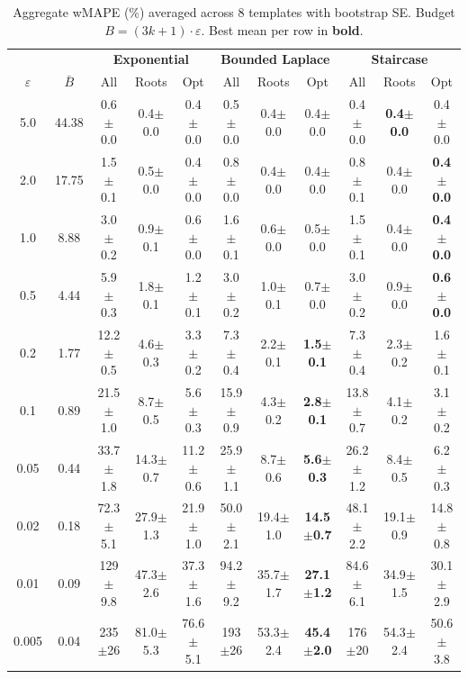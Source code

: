 \providecommand{\pmstd}[1]{{\scriptsize $\pm$#1}}

\begin{table}[t]
\centering
\setlength{\tabcolsep}{2.8pt}
\small
\caption{Aggregate wMAPE (\%) averaged across 8 templates with bootstrap SE. Budget $B = (3k+1) \cdot \varepsilon$. Best mean per row in \textbf{bold}.}
\label{tab:rq1_3kplus1_wmape}
\begin{tabular}{cc|ccc|ccc|ccc}
\toprule
& & \multicolumn{3}{c|}{\textbf{Exponential}} & \multicolumn{3}{c|}{\textbf{Bounded Laplace}} & \multicolumn{3}{c}{\textbf{Staircase}} \\
$\varepsilon$ & $\bar{B}$ & All & Roots & Opt & All & Roots & Opt & All & Roots & Opt \\
\midrule
5.0 & 44.38 & 0.6\pmstd{0.0} & 0.4\pmstd{0.0} & 0.4\pmstd{0.0} & 0.5\pmstd{0.0} & 0.4\pmstd{0.0} & 0.4\pmstd{0.0} & 0.4\pmstd{0.0} & \textbf{0.4\pmstd{0.0}} & 0.4\pmstd{0.0} \\
2.0 & 17.75 & 1.5\pmstd{0.1} & 0.5\pmstd{0.0} & 0.4\pmstd{0.0} & 0.8\pmstd{0.0} & 0.4\pmstd{0.0} & 0.4\pmstd{0.0} & 0.8\pmstd{0.1} & 0.4\pmstd{0.0} & \textbf{0.4\pmstd{0.0}} \\
1.0 & 8.88 & 3.0\pmstd{0.2} & 0.9\pmstd{0.1} & 0.6\pmstd{0.0} & 1.6\pmstd{0.1} & 0.6\pmstd{0.0} & 0.5\pmstd{0.0} & 1.5\pmstd{0.1} & 0.4\pmstd{0.0} & \textbf{0.4\pmstd{0.0}} \\
0.5 & 4.44 & 5.9\pmstd{0.3} & 1.8\pmstd{0.1} & 1.2\pmstd{0.1} & 3.0\pmstd{0.2} & 1.0\pmstd{0.1} & 0.7\pmstd{0.0} & 3.0\pmstd{0.2} & 0.9\pmstd{0.0} & \textbf{0.6\pmstd{0.0}} \\
0.2 & 1.77 & 12.2\pmstd{0.5} & 4.6\pmstd{0.3} & 3.3\pmstd{0.2} & 7.3\pmstd{0.4} & 2.2\pmstd{0.1} & \textbf{1.5\pmstd{0.1}} & 7.3\pmstd{0.4} & 2.3\pmstd{0.2} & 1.6\pmstd{0.1} \\
0.1 & 0.89 & 21.5\pmstd{1.0} & 8.7\pmstd{0.5} & 5.6\pmstd{0.3} & 15.9\pmstd{0.9} & 4.3\pmstd{0.2} & \textbf{2.8\pmstd{0.1}} & 13.8\pmstd{0.7} & 4.1\pmstd{0.2} & 3.1\pmstd{0.2} \\
0.05 & 0.44 & 33.7\pmstd{1.8} & 14.3\pmstd{0.7} & 11.2\pmstd{0.6} & 25.9\pmstd{1.1} & 8.7\pmstd{0.6} & \textbf{5.6\pmstd{0.3}} & 26.2\pmstd{1.2} & 8.4\pmstd{0.5} & 6.2\pmstd{0.3} \\
0.02 & 0.18 & 72.3\pmstd{5.1} & 27.9\pmstd{1.3} & 21.9\pmstd{1.0} & 50.0\pmstd{2.1} & 19.4\pmstd{1.0} & \textbf{14.5\pmstd{0.7}} & 48.1\pmstd{2.2} & 19.1\pmstd{0.9} & 14.8\pmstd{0.8} \\
0.01 & 0.09 & 129\pmstd{9.8} & 47.3\pmstd{2.6} & 37.3\pmstd{1.6} & 94.2\pmstd{9.2} & 35.7\pmstd{1.7} & \textbf{27.1\pmstd{1.2}} & 84.6\pmstd{6.1} & 34.9\pmstd{1.5} & 30.1\pmstd{2.9} \\
0.005 & 0.04 & 235\pmstd{26} & 81.0\pmstd{5.3} & 76.6\pmstd{5.1} & 193\pmstd{26} & 53.3\pmstd{2.4} & \textbf{45.4\pmstd{2.0}} & 176\pmstd{20} & 54.3\pmstd{2.4} & 50.6\pmstd{3.8} \\
\bottomrule
\end{tabular}
\end{table}
